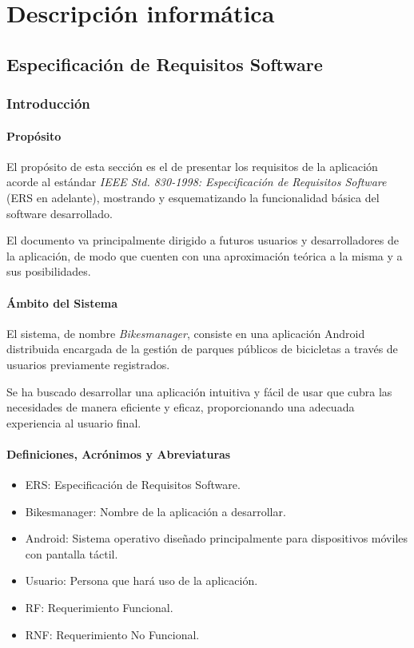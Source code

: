 \chapter{Descripción informática}


\section{Especificación de Requisitos Software}
\label{sec:secERS}

\subsection{Introducción}

\subsubsection{Propósito}

El propósito de esta sección es el de presentar los requisitos de la aplicación acorde al estándar \emph{IEEE Std. 830-1998: Especificación de Requisitos Software} (ERS en adelante), mostrando y esquematizando la funcionalidad básica del software desarrollado.

El documento va principalmente dirigido a futuros usuarios y desarrolladores de la aplicación, de modo que cuenten con una aproximación teórica a la misma y a sus posibilidades.

\subsubsection{Ámbito del Sistema}

El sistema, de nombre \emph{Bikesmanager}, consiste en una aplicación Android distribuida encargada de la gestión de parques públicos de bicicletas a través de usuarios previamente registrados.

Se ha buscado desarrollar una aplicación intuitiva y fácil de usar que cubra las necesidades de manera eficiente y eficaz, proporcionando una adecuada experiencia al usuario final.

\subsubsection{Definiciones, Acrónimos y Abreviaturas}

\begin{itemize}
	\item ERS: Especificación de Requisitos Software.
	\item Bikesmanager: Nombre de la aplicación a desarrollar.
	\item Android: Sistema operativo diseñado principalmente para dispositivos móviles con pantalla táctil.
	\item Usuario: Persona que hará uso de la aplicación.
	\item RF: Requerimiento Funcional.
	\item RNF: Requerimiento No Funcional.
\end{itemize}

